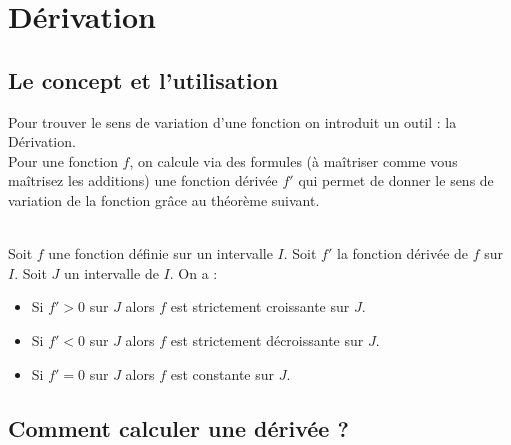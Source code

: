 \documentclass[12pt,fleqn]{report} %
\begin{document}
\section{Dérivation}
\subsection{Le concept et l'utilisation}
Pour trouver le sens de variation d'une fonction on introduit un outil : la Dérivation.\\
Pour une fonction $f$, on calcule via des formules (à maîtriser comme vous maîtrisez les additions) une fonction dérivée $f'$ qui permet de donner le sens de variation de la fonction grâce au théorème suivant.




\begin{theorem}\text{ }\\
	Soit $f$ une fonction définie sur un intervalle $I$. Soit $f'$ la fonction dérivée de $f$ sur $I$. Soit $J$ un intervalle de $I$. On a : 
	\begin{itemize}
		\item Si $f' > 0$ sur $J$ alors $f$ est strictement croissante sur $J$.
		\item Si $f' < 0$ sur $J$ alors $f$ est strictement décroissante sur $J$.
		\item Si $f' = 0$ sur $J$ alors $f$ est constante sur $J$.
	\end{itemize}
\end{theorem}

\subsection{Comment calculer une dérivée ? }
\end{document}
